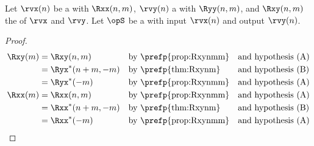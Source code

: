 \begin{corollary}
\label{cor:Rxxm}
\label{cor:Rxym}
Let $\rvx(n)$ be a  with  $\Rxx(n,m)$,
    $\rvy(n)$    a  with  $\Ryy(n,m)$,
and $\Rxy(n,m)$  the  of $\rvx$ and $\rvy$.
Let $\opS$ be a  with input $\rvx(n)$ and output $\rvy(n)$.
\end{corollary}
\begin{proof}
\begin{align*}
  \Rxy(m)
     &= \Rxy(n,m)
     && \text{by \prefp{prop:Rxynmm}}
     && \text{and hypothesis (A)}
   \\&= \Ryx^\ast(n+m,-m)
     && \text{by \prefp{thm:Rxynm}}
     && \text{and hypothesis (B)}
   \\&= \Ryx^\ast(-m)
     && \text{by \prefp{prop:Rxynmm}}
     && \text{and hypothesis (A)}
   \\
  \Rxx(m)
     &= \Rxx(n,m)
     && \text{by \prefp{prop:Rxynmm}}
     && \text{and hypothesis (A)}
   \\&= \Rxx^\ast(n+m,-m)
     && \text{by \prefp{thm:Rxynm}}
     && \text{and hypothesis (B)}
   \\&= \Rxx^\ast(-m)
     && \text{by \prefp{prop:Rxynmm}}
     && \text{and hypothesis (A)}
\end{align*}
\end{proof}


